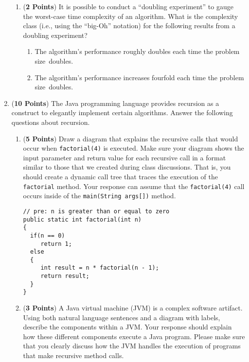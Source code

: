 \documentclass[12pt]{article}
\begin{document}
\begin{enumerate}
\begin{enumerate}

\item ({\bf 2 Points}) It is possible to conduct a ``doubling experiment'' to gauge the worst-case time complexity of an
algorithm. What is the complexity class (i.e., using the ``big-Oh'' notation) for the following results from a doubling
experiment?

\begin{enumerate}
    \item The algorithm's performance roughly doubles each time the problem \mbox{size doubles}.
    \item The algorithm's performance increases fourfold each time the problem \mbox{size doubles}.
\end{enumerate}

\end{enumerate}

\newpage

\item ({\bf 10 Points}) The Java programming language provides recursion
  as a construct to elegantly implement certain algorithms.  Answer the
  following questions about recursion.

\begin{enumerate}

\item ({\bf 5 Points}) Draw a diagram that explains the recursive
  calls that would occur when {\tt factorial(4)} is executed.  Make
  sure your diagram shows the input parameter and return value for
  each recursive call in a format similar to those that we created
  during class discussions.  That is, you should create a dynamic call
  tree that traces the execution of the {\tt factorial} method. Your
  response can assume that the {\tt factorial(4)} call occurs inside
  of the {\tt main(String args[])} method.

{\small
\begin{verbatim}
// pre: n is greater than or equal to zero
public static int factorial(int n)
{
  if(n == 0)
     return 1;
  else
  {
     int result = n * factorial(n - 1);
     return result;
  }
}
\end{verbatim}
}

\item ({\bf 3 Points}) A Java virtual machine (JVM) is a complex software artifact.  Using both natural language
  sentences and a diagram with labels, describe the components within a JVM.  Your response should explain how these
  different components execute a Java program.  Please make sure that you clearly discuss how the JVM handles the
  execution of programs that make recursive method calls.


\end{enumerate}
\end{enumerate}
\end{document}
